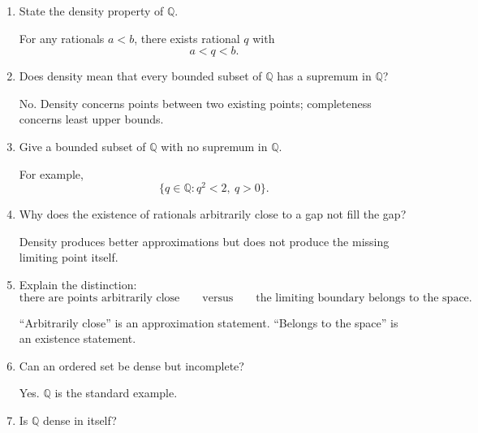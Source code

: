 \documentclass{essay}
\begin{document}
\begin{enumerate}[label=\arabic*., itemsep=10pt]

\item State the density property of $\mathbb{Q}$.

\begin{answer}
For any rationals $a<b$, there exists rational $q$ with
\[
a<q<b.
\]
\end{answer}

\item Does density mean that every bounded subset of $\mathbb{Q}$ has a supremum in $\mathbb{Q}$?

\begin{answer}
No. Density concerns points between two existing points; completeness concerns least upper bounds.
\end{answer}

\item Give a bounded subset of $\mathbb{Q}$ with no supremum in $\mathbb{Q}$.

\begin{answer}
For example,
\[
\{q\in\mathbb{Q}:q^2<2,\ q>0\}.
\]
\end{answer}

\item Why does the existence of rationals arbitrarily close to a gap not fill the gap?

\begin{answer}
Density produces better approximations but does not produce the missing limiting point itself.
\end{answer}

\item Explain the distinction:
\[
\text{there are points arbitrarily close}
\qquad\text{versus}\qquad
\text{the limiting boundary belongs to the space}.
\]

\begin{answer}
``Arbitrarily close'' is an approximation statement. ``Belongs to the space'' is an existence statement.
\end{answer}

\item Can an ordered set be dense but incomplete?

\begin{answer}
Yes. $\mathbb{Q}$ is the standard example.
\end{answer}

\item Is $\mathbb{Q}$ dense in itself?


\end{enumerate}
\end{document}
